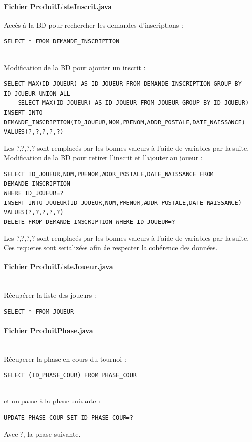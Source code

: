 \documentclass[10pt,a4paper]{report}
\begin{document}
\paragraph{Fichier ProduitListeInscrit.java}
Accès à la BD pour rechercher les demandes d'inscriptions :
\begin{verbatim}
SELECT * FROM DEMANDE_INSCRIPTION
\end{verbatim}
\\
Modification de la BD pour ajouter un inscrit :
\begin{verbatim}
SELECT MAX(ID_JOUEUR) AS ID_JOUEUR FROM DEMANDE_INSCRIPTION GROUP BY ID_JOUEUR UNION ALL 
	SELECT MAX(ID_JOUEUR) AS ID_JOUEUR FROM JOUEUR GROUP BY ID_JOUEUR)
INSERT INTO DEMANDE_INSCRIPTION(ID_JOUEUR,NOM,PRENOM,ADDR_POSTALE,DATE_NAISSANCE) 
VALUES(?,?,?,?,?)
\end{verbatim}
Les ?,?,?,? sont remplacés par les bonnes valeurs à l'aide de variables par la suite.
\\
Modification de la BD pour retirer l'inscrit et l'ajouter au joueur :

\begin{verbatim}
SELECT ID_JOUEUR,NOM,PRENOM,ADDR_POSTALE,DATE_NAISSANCE FROM DEMANDE_INSCRIPTION 
WHERE ID_JOUEUR=?
INSERT INTO JOUEUR(ID_JOUEUR,NOM,PRENOM,ADDR_POSTALE,DATE_NAISSANCE) 
VALUES(?,?,?,?,?)
DELETE FROM DEMANDE_INSCRIPTION WHERE ID_JOUEUR=?
\end{verbatim}
Les ?,?,?,? sont remplacés par les bonnes valeurs à l'aide de variables par la suite.
Ces requetes sont serializées afin de respecter la cohérence des données.

\paragraph{Fichier ProduitListeJoueur.java}
\\
Récupérer la liste des joueurs :
\begin{verbatim}
SELECT * FROM JOUEUR
\end{verbatim}

\paragraph{Fichier ProduitPhase.java}
\\
Récuperer la phase en cours du tournoi :
\begin{verbatim}
SELECT (ID_PHASE_COUR) FROM PHASE_COUR
\end{verbatim}
\\
et on passe à la phase suivante :
\begin{verbatim}
UPDATE PHASE_COUR SET ID_PHASE_COUR=?
\end{verbatim}
Avec ?, la phase suivante.
\\
\end{document}
